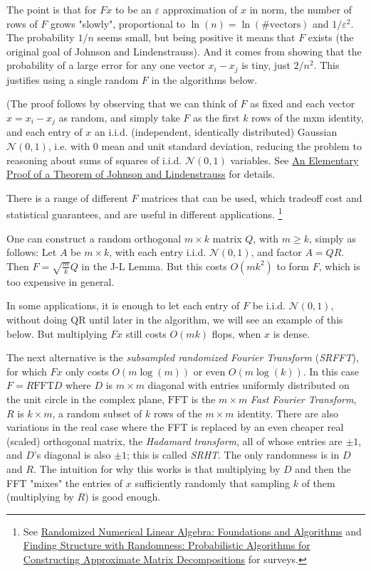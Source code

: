 \documentclass[11pt]{article}
\numberwithin{equation}{section}
\begin{document}
The point is that for $Fx$ to be an $\varepsilon$ approximation of $x$ in norm, the number of rows of $F$ grows "slowly", 
proportional to $\ln(n) = \ln(\#\mathrm{vectors})$ and $1/\varepsilon^2$. The probability $1/n$ seems small, but being positive it means that $F$ exists
(the original goal of Johnson and Lindenstrauss). And it comes from showing that the probability of a large error for any one vector $x_i - x_j$ is tiny, 
just $2/n^2$. This justifies using a single random $F$ in the algorithms below.

(The proof follows by observing that we can think of $F$ as fixed and each vector $x=x_i - x_j$ as random, 
and simply take $F$ as the first $k$ rows of the mxm identity, and each entry of $x$ an i.i.d. (independent, identically distributed) Gaussian $\mathcal{N}(0,1)$,
i.e. with 0 mean and unit standard deviation, reducing the problem to reasoning about sums of squares of i.i.d. $\mathcal{N}(0,1)$ variables. 
See \href{http://cseweb.ucsd.edu/~dasgupta/papers/jl.pdf}{An Elementary Proof of a Theorem of Johnson and Lindenstrauss} for details.

There is a range of different $F$ matrices that can be used, which tradeoff cost and statistical guarantees, and are useful in different applications.
\footnote{See \href{https://arxiv.org/abs/2002.01387}{Randomized Numerical Linear Algebra: Foundations and Algorithms} and \href{http://arxiv.org/abs/0909.4061}{Finding Structure with Randomness: Probabilistic Algorithms for Constructing Approximate Matrix Decompositions} for surveys.}

One can construct a random orthogonal $m \times k$ matrix $Q$, with $m \geq k$, simply as follows:
Let $A$ be $m \times k$, with each entry i.i.d. $\mathcal{N}(0,1)$, and factor $A = QR$. Then $F = \sqrt{\frac{m}{k}} Q$ in the J-L Lemma.
But this costs $O(mk^2)$ to form $F$, which is too expensive in general.

In some applications, it is enough to let each entry of $F$ be i.i.d. $\mathcal{N}(0,1)$, without doing QR until later in the algorithm, 
we will see an example of this below.  But multiplying $Fx$ still costs $O(mk)$ flops, when $x$ is dense.

The next alternative is the \textit{subsampled randomized Fourier Transform} (\textit{SRFFT}), for which $Fx$ only costs $O(m\log(m))$ or even $O(m\log(k))$. 
In this case $F = R \mathrm{FFT} D$ where $D$ is $m \times m$ diagonal with entries uniformly distributed on the unit circle in the complex plane,
$\mathrm{FFT}$ is the $m \times m$ \textit{Fast Fourier Transform}, $R$ is $k \times m$, a random subset of $k$ rows of the $m \times m$ identity.
There are also variations in the real case where the FFT is replaced by an even cheaper real (scaled) orthogonal matrix, the \textit{Hadamard transform}, 
all of whose entries are $\pm 1$, and $D$'s diagonal is also $\pm 1$; this is called \textit{SRHT}. The only randomness is in $D$ and $R$.
The intuition for why this works is that multiplying by $D$ and then the FFT "mixes" the entries of $x$ sufficiently randomly that sampling $k$ of them (multiplying by $R$) is good enough.
\end{document}
